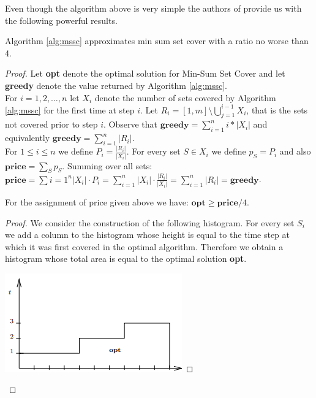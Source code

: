 Even though the algorithm above is very simple the authors of \cite{FLT04} provide us with the following powerful results.

\begin{theorem}\label{t:mssc_apx}
    Algorithm \ref{alg:mssc} approximates min sum set cover with a ratio no worse than 4.
\end{theorem}

\begin{proof}
    Let \textbf{opt} denote the optimal solution for Min-Sum Set Cover and let \textbf{greedy} denote the value returned by Algorithm \ref{alg:mssc}. \\
    
    For $i = 1, 2, \ldots, n$ let $X_i$ denote the number of sets covered by Algorithm \ref{alg:mssc} for the first time at step $i$. Let $R_i = [1,m] \setminus \bigcup_{j=1}^{i-1} X_i$, that is the sets not covered prior to step $i$. Observe that $\textbf{greedy} = \sum_{i=1}^n i * |X_i|$ and equivalently $\textbf{greedy} = \sum_{i=1}^n |R_i|$. \\
    
    For $1 \leq i \leq n$ we define $P_i = \frac{|R_i|}{|X_i|}$. For every set $S \in X_i$ we define $p_S = P_i$ and also $\textbf{price} = \sum_{S} p_S$. Summing over all sets: $\textbf{price} = \sum{i=1}^n |X_i| \cdot P_i = \sum_{i=1}^n |X_i| \cdot \frac{|R_i|}{|X_i|} = \sum_{i=1}^n |R_i| = \textbf{greedy}$. \\
    
    \begin{lemma}\label{l:static_greedy}
        For the assignment of price given above we have: $\textbf{opt} \geq \textbf{price} / 4$. 
    \end{lemma}
    
    \begin{proof}
        We consider the construction of the following histogram. For every set $S_i$ we add a column to the histogram whose height is equal to the time step at which it was first covered in the optimal algorithm. Therefore we obtain a histogram whose total area is equal to the optimal solution \textbf{opt}.
        
        \includegraphics[]{chapters/introduction/histogram_opt.png}
        

\end{proof}
\end{proof}
